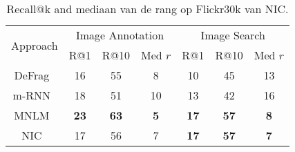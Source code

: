 \begin{table}
	\centering
	\begin{small}
		\setlength{\tabcolsep}{3pt}
		\begin{tabular}{|c|ccc|ccc|}
			\hline
			\multirow{2}{*}{Approach} & \multicolumn{3}{c|}{Image Annotation} & \multicolumn{3}{c|}{Image Search} \\
			& R@1 & R@10 & Med $r$ &  R@1 & R@10 & Med $r$ \\
			\hline
			\hline
			DeFrag~\cite{Karpathy2014} & 16 & 55 & 8             &    10 & 45 & 13  \\
			m-RNN~\cite{Mao2014}         &  18 & 51 & 10               &  13 & 42 & 16\\
			MNLM~\cite{Kiros2014}        &  \textbf{23}   & \textbf{63} & \textbf{5}        &  \textbf{17} & \textbf{57} & \textbf{8}   \\
			\hline
			NIC~\cite{Google}                           &  17 & 56  & 7               &    \textbf{17} & \textbf{57} & \textbf{7} \\
			\hline
		\end{tabular}
	\end{small}
	\caption{Recall@k and mediaan van de rang op Flickr30k van NIC.\label{tab:recall@1030k}}
	\label{table:recall}
\end{table}




